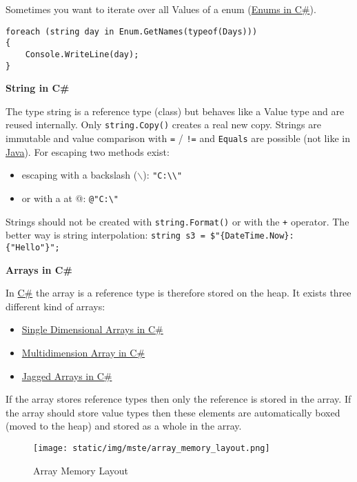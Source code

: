 \documentclass[11pt,twoside,landscape]{article}
\begin{document}
\begin{multicols}{3}
Sometimes you want to iterate over all Values of a enum (\href{../../../roam/20211006113326-enums_in_c.org}{Enums in C\#}).

\lstset{language=csharp,label= ,caption= ,captionpos=b,numbers=none}
\begin{lstlisting}
foreach (string day in Enum.GetNames(typeof(Days)))
{
    Console.WriteLine(day);
}
\end{lstlisting}

\textbf{String in C\#}

The type string is a reference type (class) but behaves like a Value type and are reused internally.
Only \texttt{string.Copy()} creates a real new copy.
Strings are immutable and value comparison with \texttt{=} / \texttt{!=} and \texttt{Equals} are possible (not like in \href{../../../roam/20201116150053-java.org}{Java}).
For escaping two methods exist:
\begin{itemize}
\item escaping with a backslash ($\backslash$): \texttt{"C:\textbackslash{}\textbackslash{}"}
\item or with a at @: \texttt{@"C:\textbackslash{}"}
\end{itemize}


Strings should not be created with \texttt{string.Format()} or with the \texttt{+} operator.
The better way is string interpolation: \texttt{string s3 = \$"\{DateTime.Now\}: \{"Hello"\}";}

\textbf{Arrays in C\#}

In \href{../../../roam/20211003114158-c.org}{C\#} the array is a reference type is therefore stored on the heap.
It exists three different kind of arrays:
\begin{itemize}
\item \href{../../../roam/20211008083138-single_dimensional_arrays_in_c.org}{Single Dimensional Arrays in C\#}
\item \href{../../../roam/20211008083241-multidimension_array_in_c.org}{Multidimension Array in C\#}
\item \href{../../../roam/20211008083300-jagged_arrays_in_c.org}{Jagged Arrays in C\#}
\end{itemize}


If the array stores reference types then only the reference is stored in the array. If the array should store value types then these elements are automatically boxed (moved to the heap) and stored as a whole in the array.

\begin{figure}[htbp]
\centering
\texttt{[image: static/img/mste/array\_memory\_layout.png]}
\caption{\label{fig:org4248a2f}Array Memory Layout}
\end{figure}


\end{multicols}
\end{document}
